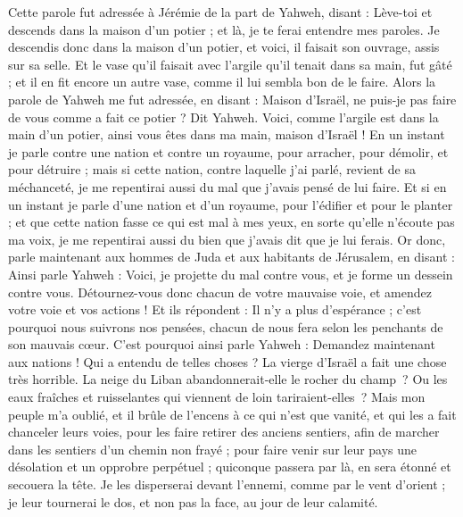 \begin{multicols}{2}
\VerseOne{}Cette parole fut adressée à Jérémie de la part de Yahweh, disant :
Lève-toi et descends dans la maison d'un potier ; et là, je te ferai entendre mes paroles.
Je descendis donc dans la maison d'un potier, et voici, il faisait son ouvrage, assis sur sa selle.
Et le vase qu'il faisait avec l'argile qu'il tenait dans sa main, fut gâté ; et il en fit encore un autre vase, comme il lui sembla bon de le faire.
Alors la parole de Yahweh me fut adressée, en disant :
Maison d'Israël, ne puis-je pas faire de vous comme a fait ce potier ? Dit Yahweh. Voici, comme l'argile est dans la main d'un potier, ainsi vous êtes dans ma main, maison d'Israël !
En un instant je parle contre une nation et contre un royaume, pour arracher, pour démolir, et pour détruire ;
mais si cette nation, contre laquelle j'ai parlé, revient de sa méchanceté, je me repentirai aussi du mal que j'avais pensé de lui faire.
Et si en un instant je parle d'une nation et d'un royaume, pour l'édifier et pour le planter ;
 et que cette nation fasse ce qui est mal à mes yeux, en sorte qu'elle n'écoute pas ma voix, je me repentirai aussi du bien que j'avais dit que je lui ferais.
Or donc, parle maintenant aux hommes de Juda et aux habitants de Jérusalem, en disant : Ainsi parle Yahweh : Voici, je projette du mal contre vous, et je forme un dessein contre vous. Détournez-vous donc chacun de votre mauvaise voie, et amendez votre voie et vos actions !
Et ils répondent : Il n'y a plus d'espérance ; c'est pourquoi nous suivrons nos pensées, chacun de nous fera selon les penchants de son mauvais cœur.
C'est pourquoi ainsi parle Yahweh : Demandez maintenant aux nations ! Qui a entendu de telles choses ? La vierge d'Israël a fait une chose très horrible.
La neige du Liban abandonnerait-elle le rocher du champ ? Ou les eaux fraîches et ruisselantes qui viennent de loin tariraient-elles ?
Mais mon peuple m'a oublié, et il brûle de l'encens à ce qui n'est que vanité, et qui les a fait chanceler leurs voies, pour les faire retirer des anciens sentiers, afin de marcher dans les sentiers d'un chemin non frayé ;
pour faire venir sur leur pays une désolation et un opprobre perpétuel ; quiconque passera par là, en sera étonné et secouera la tête.
Je les disperserai devant l'ennemi, comme par le vent d'orient ; je leur tournerai le dos, et non pas la face, au jour de leur calamité.

\end{multicols}

